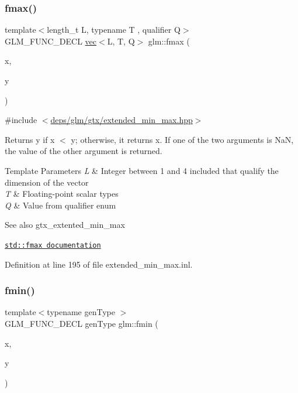 \subsubsection{\texorpdfstring{fmax()}{fmax()}\hspace{0.1cm}{\footnotesize\ttfamily [3/3]}}
{\footnotesize\ttfamily template$<$length\+\_\+t L, typename T , qualifier Q$>$ \\
G\+L\+M\+\_\+\+F\+U\+N\+C\+\_\+\+D\+E\+CL \hyperlink{structglm_1_1vec}{vec}$<$L, T, Q$>$ glm\+::fmax (\begin{DoxyParamCaption}\item[{\hyperlink{structglm_1_1vec}{vec}$<$ L, T, Q $>$ const \&}]{x,  }\item[{\hyperlink{structglm_1_1vec}{vec}$<$ L, T, Q $>$ const \&}]{y }\end{DoxyParamCaption})}



{\ttfamily \#include $<$\hyperlink{extended__min__max_8hpp}{deps/glm/gtx/extended\+\_\+min\+\_\+max.\+hpp}$>$}

Returns y if x $<$ y; otherwise, it returns x. If one of the two arguments is NaN, the value of the other argument is returned.


\begin{DoxyTemplParams}{Template Parameters}
{\em L} & Integer between 1 and 4 included that qualify the dimension of the vector \\
\hline
{\em T} & Floating-\/point scalar types \\
\hline
{\em Q} & Value from qualifier enum\\
\hline
\end{DoxyTemplParams}
\begin{DoxySeeAlso}{See also}
gtx\+\_\+extented\+\_\+min\+\_\+max 

\href{http://en.cppreference.com/w/cpp/numeric/math/fmax}{\tt std\+::fmax documentation} 
\end{DoxySeeAlso}


Definition at line 195 of file extended\+\_\+min\+\_\+max.\+inl.

\mbox{\label{group__gtx__extended__min__max_gaa3200559611ac5b9b9ae7283547916a7}} 
\subsubsection{\texorpdfstring{fmin()}{fmin()}\hspace{0.1cm}{\footnotesize\ttfamily [1/3]}}
{\footnotesize\ttfamily template$<$typename gen\+Type $>$ \\
G\+L\+M\+\_\+\+F\+U\+N\+C\+\_\+\+D\+E\+CL gen\+Type glm\+::fmin (\begin{DoxyParamCaption}\item[{gen\+Type}]{x,  }\item[{gen\+Type}]{y }\end{DoxyParamCaption})}



